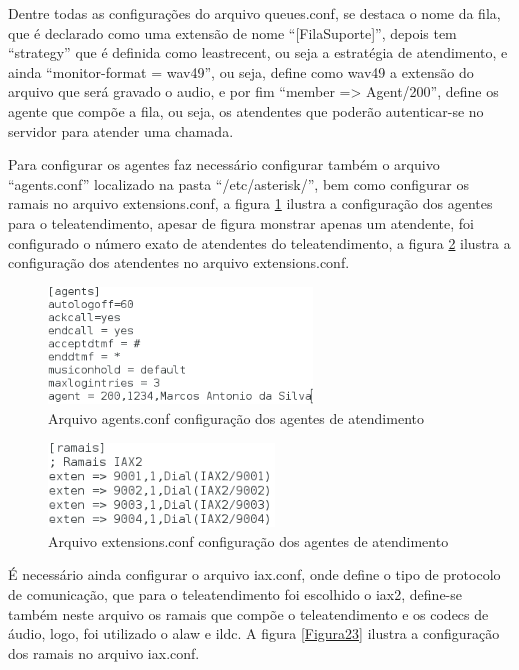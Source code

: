 Dentre todas as configurações do arquivo queues.conf, se destaca o nome da fila, que é declarado como uma extensão de nome “[FilaSuporte]”, depois tem “strategy” que é definida como leastrecent, ou seja a estratégia de atendimento, e ainda ``monitor-format = wav49'', ou seja, define como wav49 a extensão do arquivo que será gravado o audio, e por fim ``member => Agent/200'', define os agente que compõe a fila, ou seja, os atendentes que poderão autenticar-se no servidor para atender uma chamada.

Para configurar os agentes faz necessário configurar também o arquivo ``agents.conf'' localizado na pasta ``/etc/asterisk/'', bem como configurar os ramais no arquivo extensions.conf, a figura \ref{Figura21} ilustra a configuração dos agentes para o teleatendimento, apesar de figura monstrar apenas um atendente, foi configurado o número exato de atendentes do teleatendimento, a figura \ref{Figura22} ilustra a configuração dos atendentes no arquivo extensions.conf.

\begin{figure}[h]
	\centering
	\includegraphics[width=7cm]{imagens/agents.png}
	\caption{Arquivo agents.conf configuração dos agentes de atendimento}
    \label{Figura21}
\end{figure}

\begin{figure}[h]
	\centering
	\includegraphics[width=6cm]{imagens/ramais.png}
	\caption{Arquivo extensions.conf configuração dos agentes de atendimento}
    \label{Figura22}
\end{figure}

É necessário ainda configurar o arquivo iax.conf, onde define o tipo de protocolo de comunicação, que para o teleatendimento foi escolhido o iax2, define-se também  neste arquivo os ramais que compõe o teleatendimento e os codecs de áudio, logo, foi utilizado o alaw e ildc. A figura \ref{Figura23} ilustra a configuração dos ramais no arquivo iax.conf.

